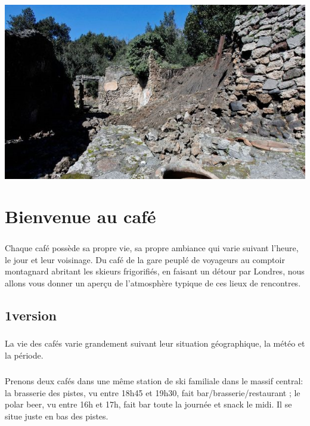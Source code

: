 \begin{center}
	\includegraphics[scale=0.5]{Pompei.jpg}
\end{center}

\chapter{Bienvenue au café}

\paragraph{} Chaque café possède sa propre vie, sa propre ambiance qui varie
suivant l'heure, le jour et leur voisinage. Du café de la gare peuplé de
voyageurs au comptoir montagnard abritant les skieurs frigorifiés, en faisant
un détour par Londres, nous allons vous donner un aperçu de l'atmosphère
typique de ces lieux de rencontres.

\section{1\iere version}

\paragraph{} La vie des cafés varie grandement suivant leur situation
géographique, la météo et la période.

\paragraph{} Prenons deux cafés dans une même station de ski familiale dans le
massif central: la brasserie des pistes, vu entre 18h45 et 19h30, fait
bar/brasserie/restaurant ; le polar beer, vu entre 16h et 17h, fait bar toute
la journée et snack le midi. Il se situe juste en bas des pistes.

